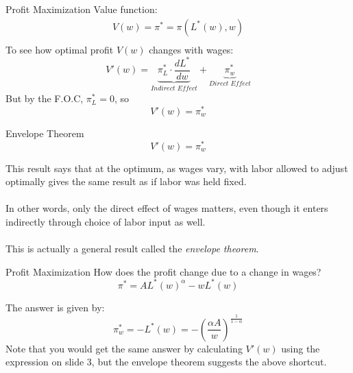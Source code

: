 \documentclass{./../../Latex/teaching_slides}
\begin{document}
\begin{frame}{Profit Maximization}
Value function:
\begin{align*}
	 V(w) = \pi^* = \pi(L^*(w), w) \\
\end{align*}
To see how optimal profit $V(w)$ changes with wages:
$$ V'(w) = \underbrace{\pi^*_{L} \cdot \frac{d L^*}{d w}}_{\textit{Indirect Effect}} + \underbrace{\pi^*_{w}}_{\textit{Direct Effect}}$$
\pause But by the F.O.C, $\pi^*_{L} =0$, so
$$ V'(w) = \pi^*_{w} $$
\end{frame}

\begin{frame}{Envelope Theorem}
$$ V'(w) = \pi^*_{w} $$
\vspace{0.25em}

This result says that at the optimum, as wages vary, with labor allowed to
adjust optimally gives the same result as if labor was held fixed. \\~\\

In other words, only the direct effect of wages matters, even though it enters indirectly through choice of labor input as well. \\~\\

This is actually a general result called the \textit{envelope theorem}.

\end{frame}

\begin{frame}{Profit Maximization}
How does the profit change due to a change in wages?
$$ \pi^* = AL^*(w)^{\alpha}-wL^*(w) $$

The answer is given by:
$$ \pi^*_w = -L^*(w) = - \left(\frac{\alpha A}{w}\right)^{\frac{1}{1-\alpha}} $$
Note that you would get the same answer by calculating $V'(w)$ using the expression on slide 3, but the envelope theorem suggests the above shortcut. 
\end{frame}
\end{document}
